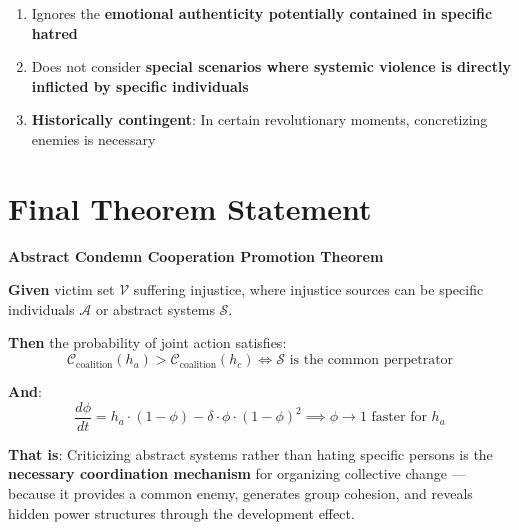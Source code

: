 \documentclass[12pt,a4paper]{article}
\newcommand{\calV}{\mathcal{V}}
\newcommand{\calA}{\mathcal{A}}
\newcommand{\calS}{\mathcal{S}}
\newcommand{\calC}{\mathcal{C}}
\begin{document}
\begin{enumerate}
    \item Ignores the \textbf{emotional authenticity potentially contained in specific hatred}
    \item Does not consider \textbf{special scenarios where systemic violence is directly inflicted by specific individuals}
    \item \textbf{Historically contingent}: In certain revolutionary moments, concretizing enemies is necessary
\end{enumerate}

\section{Final Theorem Statement}

\textbf{Abstract Condemn Cooperation Promotion Theorem}

\textbf{Given} victim set $\calV$ suffering injustice, where injustice sources can be specific individuals $\calA$ or abstract systems $\calS$.

\textbf{Then} the probability of joint action satisfies:
$$\boxed{\calC_{\text{coalition}}(h_a) > \calC_{\text{coalition}}(h_c) \iff \calS \text{ is the common perpetrator}}$$

\textbf{And}:
$$\frac{d\phi}{dt} = h_a \cdot (1-\phi) - \delta \cdot \phi \cdot (1-\phi)^2 \implies \phi \to 1 \text{ faster for } h_a$$

\textbf{That is}: Criticizing abstract systems rather than hating specific persons is the \textbf{necessary coordination mechanism} for organizing collective change — because it provides a common enemy, generates group cohesion, and reveals hidden power structures through the development effect.
\end{document}
